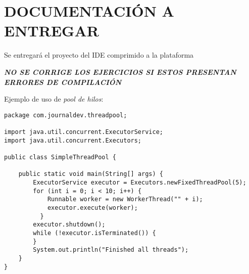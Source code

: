 \documentclass[addpoints]{exam}
\begin{document}
\section{DOCUMENTACIÓN A ENTREGAR}
Se entregará el proyecto del IDE comprimido a la plataforma
\vspace{0.5cm}
\begin{center}
\begin{large}
\textbf{\textit{NO SE CORRIGE LOS EJERCICIOS SI ESTOS PRESENTAN ERRORES DE COMPILACIÓN}
}\end{large}
\end{center}
\newpage
Ejemplo de uso de \emph{pool de hilos}:
\begin{lstlisting}
package com.journaldev.threadpool;

import java.util.concurrent.ExecutorService;
import java.util.concurrent.Executors;

public class SimpleThreadPool {

    public static void main(String[] args) {
        ExecutorService executor = Executors.newFixedThreadPool(5);
        for (int i = 0; i < 10; i++) {
            Runnable worker = new WorkerThread("" + i);
            executor.execute(worker);
          }
        executor.shutdown();
        while (!executor.isTerminated()) {
        }
        System.out.println("Finished all threads");
    }
}
\end{lstlisting}
\end{document}
